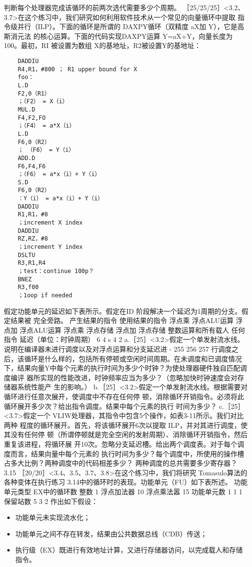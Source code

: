 判断每个处理器完成该循环的前两次选代需要多少个周期。
［25/25/25］<3.2、3.7>在这个练习中，我们研究如何利用软件技术从一个常见的向量循环中提取
指令级并行（ILP）。下面的循环是所谓的 DAXPY循环（双精度 aX加 Y），它是高斯消元法
的核心运算。下面的代码实现DAXPY运算 Y=aX+Y，向量长度为100。最初，RI 被设置为数组
X的基地址，R2被设置Y的基地址：
\begin{verbatim}
    DADDIU
    R4,R1，#800 ； R1 upper bound for X
    foo：
    L.D
    F2,0（R1）
    ；（F2） = X（i）
    MUL.D
    F4,F2,FO
    ；（F4） = a*X（i）
    L.D
    F6,0（R2）
    ； （F6） = Y（i）
    ADD.D
    F6,F4,F6
    ；（F6） = a*x（i）+ Y（i）
    S.D
    F6,0（R2）
    ：Y（i） = a*x（i）+ Y（i）
    DADDIU
    R1,R1，#8
    ；increment X index
    DADDIU
    RZ,RZ，#8
    ；increment Y index
    DSLTU
    R3,R1,R4
    ；test：continue 100p？
    BNEZ
    R3,f00
    ；1oop if needed
\end{verbatim}
假定功能单元的延迟如下表所示。假定在ID 阶段解决一个延迟为1周期的分支。假定结果被
完全旁路。
产生结果的指令
使用结果的指令
浮点乘
浮点ALU运算
浮点加
浮点ALU运算
浮点乘
浮点存储
浮点加
浮点存储
整数运算和所有载人
任何指令
延迟（单位：时钟周期）
6
4
s
4
2
a.［25］<3.2>假定一个单发射流水线。说明在编译器未进行调度以及对浮点运算和分支延迟进
-
255
256
257
行调度之后，该循环是什么样的，包括所有停顿或空闲时间周期。在未调度和已调度情况
下，结果向量Y中每个元素的执行时间为多少个时钟？为使处理器硬件独自匹配调度编评
器所实现的性能改进，时钟频率应当为多少？（忽略加快时钟速度会对存储器系统性能产
生的影响。）
b.［25］<3.2>假定一个单发射流水线。根据需要对循环进行任意次展开，使调度中不存在任何停
顿，消除循环开销指令。必须将此循环展开多少次？给出指令调度。结果中每个元素的执行
时间为多少？
c.［25］<3.7>假定一个 VLIW处理器，其指令中包含5个操作，如表3-11所示。我们对比两种
程度的循环展开。首先，将该循环展开6次以提取 ILP，并对其进行调度，使其没有任何停
顿（所谓停顿就是完全空闲的发射周期）、消除循环开销指令，然后重复该进程，将循环展
开10次。忽略分支延迟槽。给出两个调度表。对于每个调度而言，结果向量中每个元素的
执行时间为多少？每个调度中，所使用的操作槽占多大比例？两种调度中的代码相差多少？
两种调度的总共需要多少寄存器？
3.15
［20/20］<3.4、3.5、3.7、3.8>在这个练习中，我们将研究 Tomasulo算法的各种变体在执行练习
3.14中的循环时的表现。功能单元（FU）如下表所述。
功能单元类型
EX中的循环数
整数
1
浮点加法器
10
浮点乘法嚣
15
功能单元数
1
1
1
保留站数
5
3
2
作出如下假设：
\begin{itemize}
    \item 功能单元未实现流水化；
    \item 功能单元之间不存在转发，结果由公共数据总线（CDB）传送；
    \item 执行级（EX）既进行有效地址计算，又进行存储器访问，以完成载人和存储指令。
\end{itemize}

